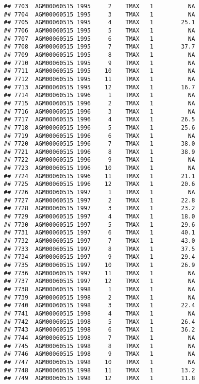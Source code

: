 \documentclass{article}\usepackage[]{graphicx}\usepackage[]{color}
\makeatletter
\newenvironment{kframe}{%
 \def\at@end@of@kframe{}%
 \ifinner\ifhmode%
  \def\at@end@of@kframe{\end{minipage}}%
  \begin{minipage}{\columnwidth}%
 \fi\fi%
 \def\FrameCommand##1{\hskip\@totalleftmargin \hskip-\fboxsep
 \colorbox{shadecolor}{##1}\hskip-\fboxsep
     \hskip-\linewidth \hskip-\@totalleftmargin \hskip\columnwidth}%
 \MakeFramed {\advance\hsize-\width
   \@totalleftmargin\z@ \linewidth\hsize
   \@setminipage}}%
 {\par\unskip\endMakeFramed%
 \at@end@of@kframe}
\newenvironment{knitrout}{}{} %
\makeatother
\begin{document}
\begin{knitrout}
\begin{kframe}
\begin{verbatim}
## 7703  AGM00060515 1995     2    TMAX   1          NA
## 7704  AGM00060515 1995     3    TMAX   1          NA
## 7705  AGM00060515 1995     4    TMAX   1        25.1
## 7706  AGM00060515 1995     5    TMAX   1          NA
## 7707  AGM00060515 1995     6    TMAX   1          NA
## 7708  AGM00060515 1995     7    TMAX   1        37.7
## 7709  AGM00060515 1995     8    TMAX   1          NA
## 7710  AGM00060515 1995     9    TMAX   1          NA
## 7711  AGM00060515 1995    10    TMAX   1          NA
## 7712  AGM00060515 1995    11    TMAX   1          NA
## 7713  AGM00060515 1995    12    TMAX   1        16.7
## 7714  AGM00060515 1996     1    TMAX   1          NA
## 7715  AGM00060515 1996     2    TMAX   1          NA
## 7716  AGM00060515 1996     3    TMAX   1          NA
## 7717  AGM00060515 1996     4    TMAX   1        26.5
## 7718  AGM00060515 1996     5    TMAX   1        25.6
## 7719  AGM00060515 1996     6    TMAX   1          NA
## 7720  AGM00060515 1996     7    TMAX   1        38.0
## 7721  AGM00060515 1996     8    TMAX   1        38.9
## 7722  AGM00060515 1996     9    TMAX   1          NA
## 7723  AGM00060515 1996    10    TMAX   1          NA
## 7724  AGM00060515 1996    11    TMAX   1        21.1
## 7725  AGM00060515 1996    12    TMAX   1        20.6
## 7726  AGM00060515 1997     1    TMAX   1          NA
## 7727  AGM00060515 1997     2    TMAX   1        22.8
## 7728  AGM00060515 1997     3    TMAX   1        23.2
## 7729  AGM00060515 1997     4    TMAX   1        18.0
## 7730  AGM00060515 1997     5    TMAX   1        29.6
## 7731  AGM00060515 1997     6    TMAX   1        40.1
## 7732  AGM00060515 1997     7    TMAX   1        43.0
## 7733  AGM00060515 1997     8    TMAX   1        37.5
## 7734  AGM00060515 1997     9    TMAX   1        29.4
## 7735  AGM00060515 1997    10    TMAX   1        26.9
## 7736  AGM00060515 1997    11    TMAX   1          NA
## 7737  AGM00060515 1997    12    TMAX   1          NA
## 7738  AGM00060515 1998     1    TMAX   1          NA
## 7739  AGM00060515 1998     2    TMAX   1          NA
## 7740  AGM00060515 1998     3    TMAX   1        22.4
## 7741  AGM00060515 1998     4    TMAX   1          NA
## 7742  AGM00060515 1998     5    TMAX   1        26.4
## 7743  AGM00060515 1998     6    TMAX   1        36.2
## 7744  AGM00060515 1998     7    TMAX   1          NA
## 7745  AGM00060515 1998     8    TMAX   1          NA
## 7746  AGM00060515 1998     9    TMAX   1          NA
## 7747  AGM00060515 1998    10    TMAX   1          NA
## 7748  AGM00060515 1998    11    TMAX   1        13.2
## 7749  AGM00060515 1998    12    TMAX   1        11.8

\end{verbatim}
\end{kframe}
\end{knitrout}
\end{document}
